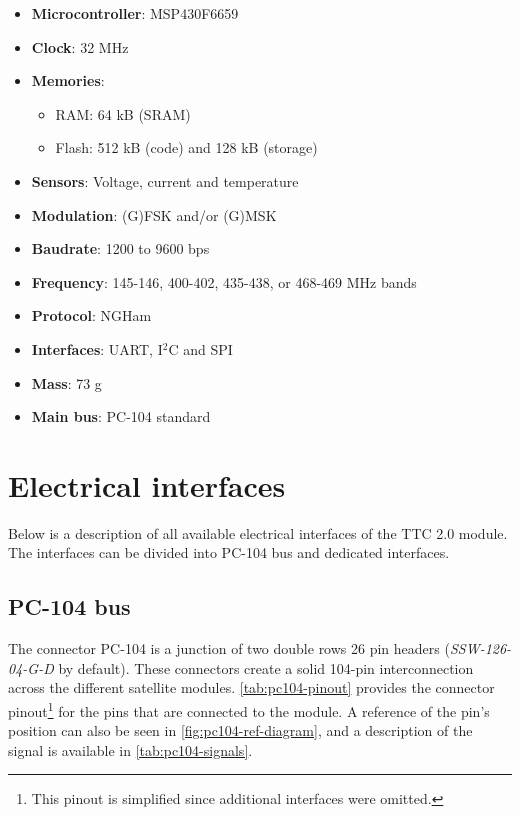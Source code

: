 \begin{itemize}
    \item \textbf{Microcontroller}: MSP430F6659
    \item \textbf{Clock}: 32 MHz
    \item \textbf{Memories}:
    \begin{itemize}
        \item RAM: 64 kB (SRAM)
        \item Flash: 512 kB (code) and 128 kB (storage)
    \end{itemize}
    \item \textbf{Sensors}: Voltage, current and temperature
    \item \textbf{Modulation}: (G)FSK and/or (G)MSK
    \item \textbf{Baudrate}: 1200 to 9600 bps
    \item \textbf{Frequency}: 145-146, 400-402, 435-438, or 468-469 MHz bands
    \item \textbf{Protocol}: NGHam
    \item \textbf{Interfaces}: UART, I$^{2}$C and SPI
    \item \textbf{Mass}: 73 g
    \item \textbf{Main bus}: PC-104 standard
\end{itemize}

\section{Electrical interfaces}

Below is a description of all available electrical interfaces of the TTC 2.0 module. The interfaces can be divided into PC-104 bus and dedicated interfaces.

\subsection{PC-104 bus}

The connector PC-104 is a junction of two double rows 26 pin headers (\textit{SSW-126-04-G-D} by default). These connectors create a solid 104-pin interconnection across the different satellite modules. \autoref{tab:pc104-pinout} provides the connector pinout\footnote{This pinout is simplified since additional interfaces were omitted.} for the pins that are connected to the module. A reference of the pin's position can also be seen in \autoref{fig:pc104-ref-diagram}, and a description of the signal is available in \autoref{tab:pc104-signals}.

